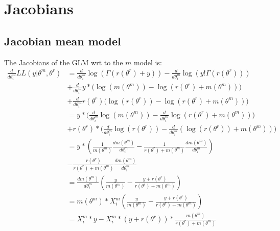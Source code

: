 \documentclass[bibliography=totoc,10pt]{scrartcl}
\begin{document}
\section{Jacobians}
\subsection{Jacobian mean model}
The Jacobians of the GLM wrt to the $m$ model is:
\begin{equation}
\begin{split}
\frac{d}{d \theta^m_i} LL(y|\theta^m, \theta^r) &= \frac{d}{d \theta^m_i} \log(\Gamma(r(\theta^r)+y)) - \frac{d}{d \theta^m_i} \log(y! \Gamma(r(\theta^r))) \\
&+ \frac{d}{d \theta^m_i} y* \bigg( \log(m(\theta^m)) -\log(r(\theta^r)+m(\theta^m)) \bigg) \\
&+ \frac{d}{d \theta^m_i} r(\theta^r) \bigg( \log(r(\theta^r)) -\log(r(\theta^r)+m(\theta^m)) \bigg) \\
&= y* \bigg( \frac{d}{d \theta^m_i} \log(m(\theta^m)) - \frac{d}{d \theta^m_i}\log(r(\theta^r)+m(\theta^m)) \bigg) \\
&+ r(\theta^r) * \bigg( \frac{d}{d \theta^m_i}\log(r(\theta^r)) - \frac{d}{d \theta^m_i} (\log(r(\theta^r))+m(\theta^m)) \bigg) \\
&= y*(\frac{1}{m(\theta^m)}  \frac{d m(\theta^m)}{d \theta^m_i} - \frac{1}{r(\theta^r)+m(\theta^m)}  \frac{d m(\theta^m)}{d \theta^m_i}) \\
&- \frac{r(\theta^r)}{r(\theta^r)+m(\theta^m)}  \frac{d m(\theta^m)}{d \theta^m_i} \\
&=  \frac{d m(\theta^m)}{d \theta^m_i} (\frac{y}{m(\theta^m)} - \frac{y+r(\theta^r)}{r(\theta^r)+m(\theta^m)}) \\
&=  m(\theta^m) * X^m_{i}  (\frac{y}{m(\theta^m)} - \frac{y+r(\theta^r)}{r(\theta^r)+m(\theta^m)}) \\
&=  X^m_{i}*y - X^m_{i}*(y+r(\theta^r))*\frac{m(\theta^m)}{r(\theta^r)+m(\theta^m)} \\
\end{split}
\end{equation}
\end{document}
